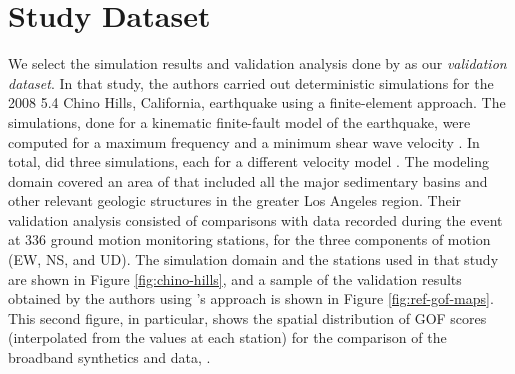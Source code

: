 
\section{Study Dataset}

We select the simulation results and validation analysis done by \citet{Taborda_2014_BSSA} as our \textit{validation dataset}. In that study, the authors carried out deterministic simulations for the 2008  5.4 Chino Hills, California, earthquake using a finite-element approach. The simulations, done for a kinematic finite-fault model of the earthquake, were computed for a maximum frequency  and a minimum shear wave velocity . In total, \citet{Taborda_2014_BSSA} did three simulations, each for a different velocity model \citep[CVM-S4, CVM-H, CVM-H+GTL, see][]{Small_2017_SRL}. The modeling domain covered an area of  that included all the major sedimentary basins and other relevant geologic structures in the greater Los Angeles region. Their validation analysis consisted of comparisons with data recorded during the event at 336 ground motion monitoring stations, for the three components of motion (EW, NS, and UD). The simulation domain and the stations used in that study are shown in Figure \ref{fig:chino-hills}, and a sample of the validation results obtained by the authors using \citeauthor{Anderson_2004_Proc}'s approach is shown in Figure \ref{fig:ref-gof-maps}. This second figure, in particular, shows the spatial distribution of GOF scores (interpolated from the values at each station) for the comparison of the broadband synthetics and data, .

